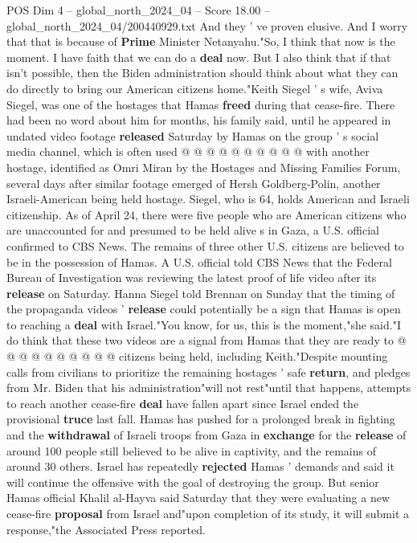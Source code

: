 \begin{textsample}{POS Dim 4 – global\_north\_2024\_04 – Score 18.00 – global\_north\_2024\_04/200440929.txt}
And they ' ve proven elusive.
And I worry that that is because of \textbf{Prime} Minister Netanyahu."So, I think that now is the moment.
I have faith that we can do a \textbf{deal} now.
But I also think that if that isn't possible, then the Biden administration should think about what they can do directly to bring our American citizens home."Keith Siegel ' s wife, Aviva Siegel, was one of the hostages that Hamas \textbf{freed} during that cease-fire.
There had been no word about him for months, his family said, until he appeared in undated video footage \textbf{released} Saturday by Hamas on the group ' s social media channel, which is often used @ @ @ @ @ @ @ @ @ @ with another hostage, identified as Omri Miran by the Hostages and Missing Families Forum, several days after similar footage emerged of Hersh Goldberg-Polin, another Israeli-American being held hostage.
Siegel, who is 64, holds American and Israeli citizenship.
As of April 24, there were five people who are American citizens who are unaccounted for and presumed to be held alive s in Gaza, a U.S. official confirmed to CBS News.
The remains of three other U.S. citizens are believed to be in the possession of Hamas.
A U.S. official told CBS News that the Federal Bureau of Investigation was reviewing the latest proof of life video after its \textbf{release} on Saturday.
Hanna Siegel told Brennan on Sunday that the timing of the propaganda videos ' \textbf{release} could potentially be a sign that Hamas is open to reaching a \textbf{deal} with Israel."You know, for us, this is the moment,"she said."I do think that these two videos are a signal from Hamas that they are ready to @ @ @ @ @ @ @ @ @ @ citizens being held, including Keith."Despite mounting calls from civilians to prioritize the remaining hostages ' safe \textbf{return}, and pledges from Mr.
Biden that his administration"will not rest"until that happens, attempts to reach another cease-fire \textbf{deal} have fallen apart since Israel ended the provisional \textbf{truce} last fall.
Hamas has pushed for a prolonged break in fighting and the \textbf{withdrawal} of Israeli troops from Gaza in \textbf{exchange} for the \textbf{release} of around 100 people still believed to be alive in captivity, and the remains of around 30 others.
Israel has repeatedly \textbf{rejected} Hamas ' demands and said it will continue the offensive with the goal of destroying the group.
But senior Hamas official Khalil al-Hayva said Saturday that they were evaluating a new cease-fire \textbf{proposal} from Israel and"upon completion of its study, it will submit a response,"the Associated Press reported.

\end{textsample}
